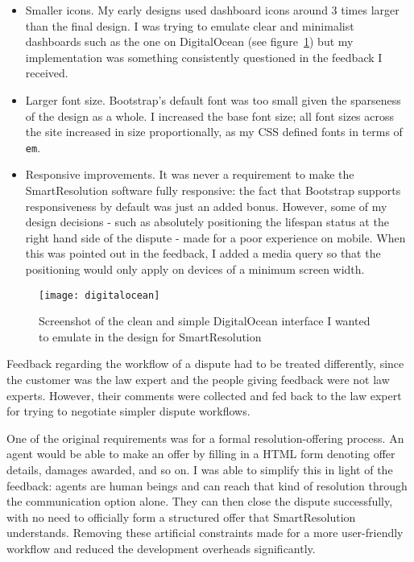 \begin{itemize}
\item Smaller icons. My early designs used dashboard icons around 3 times larger than the final design. I was trying to emulate clear and minimalist dashboards such as the one on DigitalOcean (see figure~\ref{screenshot:digitalOcean}) but my implementation was something consistently questioned in the feedback I received.
\item Larger font size. Bootstrap's default font was too small given the sparseness of the design as a whole. I increased the base font size; all font sizes across the site increased in size proportionally, as my CSS defined fonts in terms of \lstinline{em}.
\item Responsive improvements. It was never a requirement to make the SmartResolution software fully responsive: the fact that Bootstrap supports responsiveness by default was just an added bonus. However, some of my design decisions - such as absolutely positioning the lifespan status at the right hand side of the dispute - made for a poor experience on mobile. When this was pointed out in the feedback, I added a media query so that the positioning would only apply on devices of a minimum screen width.
\end{itemize}

\begin{figure}[h!]
  \centering
    \ifimages
    \texttt{[image: digitalocean]}
    \fi
  \caption{Screenshot of the clean and simple DigitalOcean interface I wanted to emulate in the design for SmartResolution}
  \label{screenshot:digitalOcean}
\end{figure}

Feedback regarding the workflow of a dispute had to be treated differently, since the customer was the law expert and the people giving feedback were not law experts. However, their comments were collected and fed back to the law expert for trying to negotiate simpler dispute workflows.

One of the original requirements was for a formal resolution-offering process. An agent would be able to make an offer by filling in a HTML form denoting offer details, damages awarded, and so on. I was able to simplify this in light of the feedback: agents are human beings and can reach that kind of resolution through the communication option alone. They can then close the dispute successfully, with no need to officially form a structured offer that SmartResolution understands. Removing these artificial constraints made for a more user-friendly workflow and reduced the development overheads significantly.